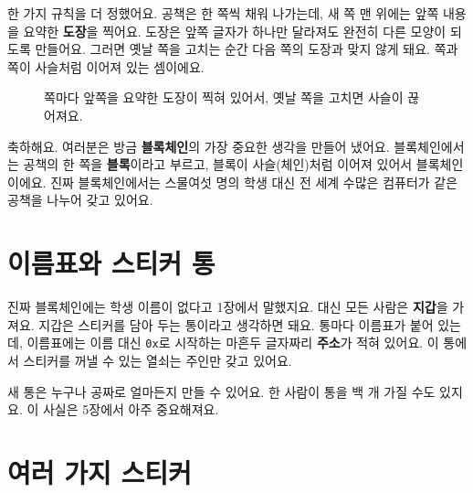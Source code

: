 한 가지 규칙을 더 정했어요.
공책은 한 쪽씩 채워 나가는데, 새 쪽 맨 위에는 앞쪽 내용을 요약한 \textbf{도장}을 찍어요.
도장은 앞쪽 글자가 하나만 달라져도 완전히 다른 모양이 되도록 만들어요.
그러면 옛날 쪽을 고치는 순간 다음 쪽의 도장과 맞지 않게 돼요.
쪽과 쪽이 사슬처럼 이어져 있는 셈이에요.

\begin{figure}[h]
\centering
{}
\caption{쪽마다 앞쪽을 요약한 도장이 찍혀 있어서, 옛날 쪽을 고치면 사슬이 끊어져요.}
\end{figure}

축하해요.
여러분은 방금 \textbf{블록체인}의 가장 중요한 생각을 만들어 냈어요.
블록체인에서는 공책의 한 쪽을 \textbf{블록}이라고 부르고, 블록이 사슬(체인)처럼 이어져 있어서 블록체인이에요.
진짜 블록체인에서는 스물여섯 명의 학생 대신 전 세계 수많은 컴퓨터가 같은 공책을 나누어 갖고 있어요.

\section{이름표와 스티커 통}

진짜 블록체인에는 학생 이름이 없다고 1장에서 말했지요.
대신 모든 사람은 \textbf{지갑}을 가져요.
지갑은 스티커를 담아 두는 통이라고 생각하면 돼요.
통마다 이름표가 붙어 있는데, 이름표에는 이름 대신 \texttt{0x}로 시작하는 마흔두 글자짜리 \textbf{주소}가 적혀 있어요.
이 통에서 스티커를 꺼낼 수 있는 열쇠는 주인만 갖고 있어요.

새 통은 누구나 공짜로 얼마든지 만들 수 있어요.
한 사람이 통을 백 개 가질 수도 있지요.
이 사실은 5장에서 아주 중요해져요.

\section{여러 가지 스티커}

